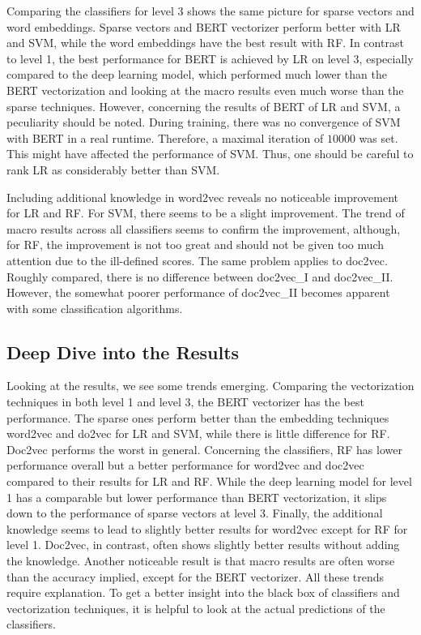 \documentclass[12pt, a4paper, titlepage]{article}
\begin{document}
Comparing the classifiers for level 3 shows the same picture for sparse vectors and word embeddings. Sparse vectors and \ac{BERT} vectorizer perform better with \ac{LR} and \ac{SVM}, while the word embeddings have the best result with \ac{RF}. In contrast to level 1, the best performance for \ac{BERT} is achieved by \ac{LR} on level 3, especially compared to the deep learning model, which performed much lower than the \ac{BERT} vectorization and looking at the macro results even much worse than the sparse techniques. However, concerning the results of \ac{BERT} of LR and SVM, a peculiarity should be noted. During training, there was no convergence of \ac{SVM} with \ac{BERT} in a real runtime. Therefore, a maximal iteration of $10000$ was set. This might have affected the performance of \ac{SVM}. Thus, one should be careful to rank \ac{LR} as considerably better than \ac{SVM}. 

Including additional knowledge in word2vec reveals no noticeable improvement for \ac{LR} and \ac{RF}. For \ac{SVM}, there seems to be a slight improvement. The trend of macro results across all classifiers seems to confirm the improvement, although, for RF, the improvement is not too great and should not be given too much attention due to the ill-defined scores. The same problem applies to doc2vec. Roughly compared, there is no difference between doc2vec\_I and doc2vec\_II. However, the somewhat poorer performance of doc2vec\_II becomes apparent with some classification algorithms. 


\subsection{Deep Dive into the Results}
Looking at the results, we see some trends emerging. Comparing the vectorization techniques in both level 1 and level 3, the \ac{BERT} vectorizer has the best performance. The sparse ones perform better than the embedding techniques word2vec and do2vec for LR and SVM, while there is little difference for RF. Doc2vec performs the worst in general. Concerning the classifiers, \ac{RF} has lower performance overall but a better performance for word2vec and doc2vec compared to their results for LR and RF. While the deep learning model for level 1 has a comparable but lower performance than \ac{BERT} vectorization, it slips down to the performance of sparse vectors at level 3. Finally, the additional knowledge seems to lead to slightly better results for word2vec except for \ac{RF} for level 1. Doc2vec, in contrast, often shows slightly better results without adding the knowledge. Another noticeable result is that macro results are often worse than the accuracy implied, except for the \ac{BERT} vectorizer. All these trends require explanation. To get a better insight into the black box of classifiers and vectorization techniques, it is helpful to look at the actual predictions of the classifiers.
\end{document}

